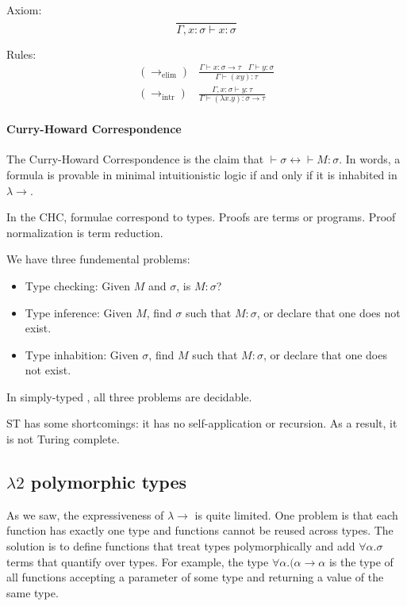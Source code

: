 Axiom:
\[
\frac{}{\Gamma, x: \sigma \vdash x: \sigma}
\]

Rules:
\[
\begin{array}{cc}
(\to_\mathrm{elim})&\frac{\Gamma \vdash x: \sigma \to \tau~~~~\Gamma \vdash y: \sigma}{\Gamma \vdash (x y): \tau} \\
(\to_\mathrm{intr})&\frac{\Gamma, x: \sigma \vdash y: \tau}{\Gamma \vdash (\lambda x. y): \sigma \to \tau}
\end{array}
\]

\paragraph{Curry-Howard Correspondence}
The Curry-Howard Correspondence is the claim that $\vdash \sigma \leftrightarrow \vdash M : \sigma$. In
words, a formula is provable in minimal intuitionistic logic if and only if it is inhabited in $\lambda\to$.

In the CHC, formulae correspond to types. Proofs are terms or programs. Proof normalization is term reduction.

We have three fundemental problems:
\begin{itemize}
\item Type checking: Given $M$ and $\sigma$, is $M : \sigma$?
\item Type inference: Given $M$, find $\sigma$ such that $M : \sigma$, or declare that one does not exist.
\item Type inhabition: Given $\sigma$, find $M$ such that $M : \sigma$, or declare that one does not exist.
\end{itemize}

In simply-typed \lc, all three problems are decidable.

ST \lc has some shortcomings: it has no self-application or recursion. As a result, it is not Turing complete.

\subsection{$\lambda2$ polymorphic types}
As we saw, the expressiveness of $\lambda\to$ is quite limited. One problem is that each function has exactly
one type and functions cannot be reused across types. The solution is to define functions that treat types
polymorphically and add $\forall \alpha. \sigma$ terms that quantify over types. For example, the type
$\forall \alpha. (\alpha \to \alpha$ is the type of all functions accepting a parameter of some type
and returning a value of the same type.

